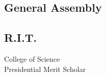 \documentclass[]{snizami-resume}
\begin{document}
\begin{minipage}[t]{0.26\textwidth}
\subsection{General Assembly}
\sectionsep

\subsection{R.I.T.}
College of Science \\
Presidential Merit Scholar\\
\sectionsep




%
%

\end{minipage} 
\hfill
\end{document}
